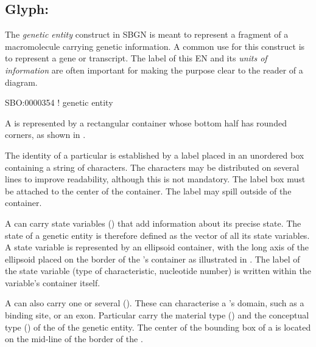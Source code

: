 
\color{red}

\subsection{Glyph: }
\label{sec:genetic}

The \emph{genetic entity} construct in SBGN is meant to represent a fragment of a macromolecule carrying genetic information.  A common use for this construct is to represent a gene or transcript.  The label of this EN and its \emph{units of information} are often important for making the purpose clear to the reader of a diagram.

\begin{glyphDescription}

\glyphSboTerm SBO:0000354 ! genetic entity

\glyphContainer A  is represented by a rectangular container whose bottom half has rounded corners, as shown in .

\glyphLabel The identity of a particular  is established by a label placed in an unordered box containing a string of characters.  The characters may be distributed on several lines to improve readability, although this is not mandatory.  The label box must be attached to the center of the container.  The label may spill outside of the container.

\glyphAux A  can carry state variables () that add information about its precise state.  The state of a genetic entity is therefore defined as the vector of all its state variables.  A state variable is represented by an ellipsoid container, with the long axis of the ellipsoid placed on the border of the 's container as illustrated in .  The label of the state variable (type of characteristic, nucleotide number) is written within the variable's container itself.

A  can also carry one or several  ().  These can characterise a 's domain, such as a binding site, or an exon.  Particular  carry the material type () and the conceptual type () of the of the genetic entity.  The center of the bounding box of a  is located on the mid-line of the border of the .

\end{glyphDescription}


